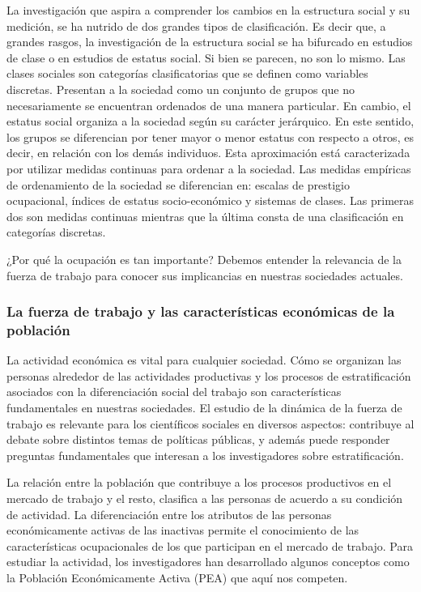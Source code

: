\documentclass[
]{article}
\begin{document}
La investigación que aspira a comprender los cambios en la estructura social y su medición, se ha nutrido de dos grandes tipos de clasificación. Es decir que, a grandes rasgos, la investigación de la estructura social se ha bifurcado en estudios de clase o en estudios de estatus social. Si bien se parecen, no son lo mismo. Las clases sociales son categorías clasificatorias que se definen como variables discretas. Presentan a la sociedad como un conjunto de grupos que no necesariamente se encuentran ordenados de una manera particular. En cambio, el estatus social organiza a la sociedad según su carácter jerárquico. En este sentido, los grupos se diferencian por tener mayor o menor estatus con respecto a otros, es decir, en relación con los demás individuos. Esta aproximación está caracterizada por utilizar medidas continuas para ordenar a la sociedad. Las medidas empíricas de ordenamiento de la sociedad se diferencian en: escalas de prestigio ocupacional, índices de estatus socio-económico y sistemas de clases. Las primeras dos son medidas continuas mientras que la última consta de una clasificación en categorías discretas.

¿Por qué la ocupación es tan importante? Debemos entender la relevancia de la fuerza de trabajo para conocer sus implicancias en nuestras sociedades actuales.

\hypertarget{la-fuerza-de-trabajo-y-las-caracteruxedsticas-econuxf3micas-de-la-poblaciuxf3n}{%
\subsubsection{La fuerza de trabajo y las características económicas de la población}\label{la-fuerza-de-trabajo-y-las-caracteruxedsticas-econuxf3micas-de-la-poblaciuxf3n}}

La actividad económica es vital para cualquier sociedad. Cómo se organizan las personas alrededor de las actividades productivas y los procesos de estratificación asociados con la diferenciación social del trabajo son características fundamentales en nuestras sociedades. El estudio de la dinámica de la fuerza de trabajo es relevante para los científicos sociales en diversos aspectos: contribuye al debate sobre distintos temas de políticas públicas, y además puede responder preguntas fundamentales que interesan a los investigadores sobre estratificación.

La relación entre la población que contribuye a los procesos productivos en el mercado de trabajo y el resto, clasifica a las personas de acuerdo a su condición de actividad. La diferenciación entre los atributos de las personas económicamente activas de las inactivas permite el conocimiento de las características ocupacionales de los que participan en el mercado de trabajo. Para estudiar la actividad, los investigadores han desarrollado algunos conceptos como la Población Económicamente Activa (PEA) que aquí nos competen.
\end{document}
